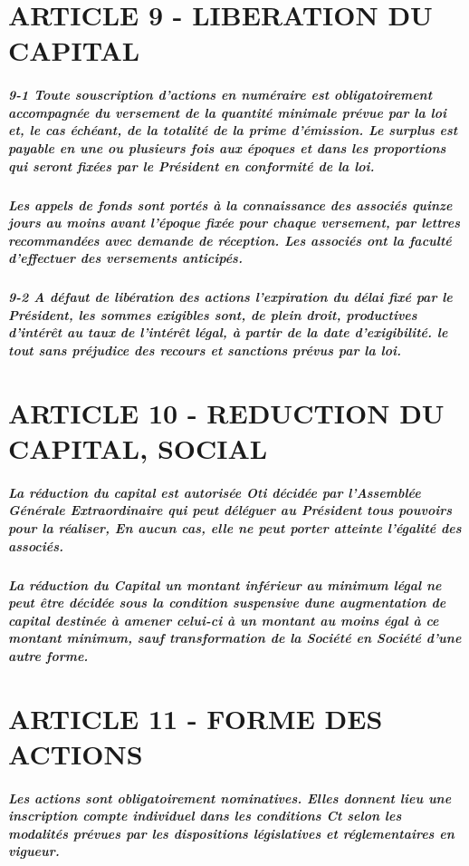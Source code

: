\documentclass[a4paper, 11pt]{article}
\begin{document}
\section*{ARTICLE 9 - LIBERATION DU CAPITAL}

\subparagraph{
  9-1 Toute souscription d'actions en numéraire est obligatoirement accompagnée du versement de la quantité minimale prévue par la loi et, le cas échéant, de la totalité de la prime d'émission. Le surplus est payable en une ou plusieurs fois aux époques et dans les proportions qui seront fixées par le Président en conformité de la loi.
}

\subparagraph{
  Les appels de fonds sont portés à la connaissance des associés quinze jours au moins avant l'époque fixée pour chaque versement, par lettres recommandées avec demande de réception. Les associés ont la faculté d'effectuer des versements anticipés.
}

\subparagraph{
  9-2 A défaut de libération des actions l'expiration du délai fixé par le Président, les sommes exigibles sont, de plein droit, productives d'intérêt au taux de l'intérêt légal, à partir de la date d'exigibilité. le tout sans préjudice des recours et sanctions prévus par la loi.
}

\section*{ARTICLE 10 - REDUCTION DU CAPITAL, SOCIAL}

\subparagraph{
  La réduction du capital est autorisée Oti décidée par l'Assemblée Générale Extraordinaire qui peut déléguer au Président tous pouvoirs pour la réaliser, En aucun cas, elle ne peut porter atteinte l'égalité des associés.
}

\subparagraph{
  La réduction du Capital un montant inférieur au minimum légal ne peut être décidée sous la condition suspensive dune augmentation de capital destinée à amener celui-ci à un montant au moins égal à ce montant minimum, sauf transformation de la Société en Société d'une autre forme.
}

\section*{ARTICLE 11 - FORME DES ACTIONS}

\subparagraph{
  Les actions sont obligatoirement nominatives. Elles donnent lieu une inscription compte individuel dans les conditions Ct selon les modalités prévues par les dispositions législatives et réglementaires en vigueur.
}
\end{document}
